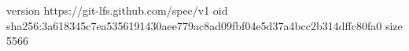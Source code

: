 version https://git-lfs.github.com/spec/v1
oid sha256:3a618345c7ea5356191430aee779ac8ad09fbf04e5d37a4bcc2b314dffc80fa0
size 5566
